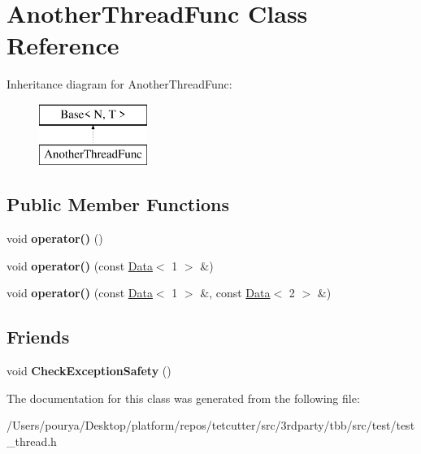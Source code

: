 \hypertarget{classAnotherThreadFunc}{}\section{Another\+Thread\+Func Class Reference}
\label{classAnotherThreadFunc}
Inheritance diagram for Another\+Thread\+Func\+:\begin{figure}[H]
\begin{center}
\leavevmode
\includegraphics[height=2.000000cm]{classAnotherThreadFunc}
\end{center}
\end{figure}
\subsection*{Public Member Functions}
\begin{DoxyCompactItemize}
\item 
\hypertarget{classAnotherThreadFunc_a261cd88bffb178a33b7bb45c14ad68c0}{}void {\bfseries operator()} ()\label{classAnotherThreadFunc_a261cd88bffb178a33b7bb45c14ad68c0}

\item 
\hypertarget{classAnotherThreadFunc_a0f94e696bff823a9d79b1a6c1a13cfb6}{}void {\bfseries operator()} (const \hyperlink{classData}{Data}$<$ 1 $>$ \&)\label{classAnotherThreadFunc_a0f94e696bff823a9d79b1a6c1a13cfb6}

\item 
\hypertarget{classAnotherThreadFunc_a57f082a7c0585425dabf91f66c09c8a7}{}void {\bfseries operator()} (const \hyperlink{classData}{Data}$<$ 1 $>$ \&, const \hyperlink{classData}{Data}$<$ 2 $>$ \&)\label{classAnotherThreadFunc_a57f082a7c0585425dabf91f66c09c8a7}

\end{DoxyCompactItemize}
\subsection*{Friends}
\begin{DoxyCompactItemize}
\item 
\hypertarget{classAnotherThreadFunc_a84f9141e5aecc728d8445144965aeb7c}{}void {\bfseries Check\+Exception\+Safety} ()\label{classAnotherThreadFunc_a84f9141e5aecc728d8445144965aeb7c}

\end{DoxyCompactItemize}


The documentation for this class was generated from the following file\+:\begin{DoxyCompactItemize}
\item 
/\+Users/pourya/\+Desktop/platform/repos/tetcutter/src/3rdparty/tbb/src/test/test\+\_\+thread.\+h\end{DoxyCompactItemize}
